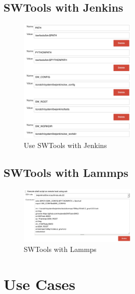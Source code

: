 \documentclass[10pt, conference, compsocconf]{IEEEtran}
\begin{document}
\subsection{SWTools with Jenkins}
\begin{figure}[H]
\centering
\includegraphics[width=0.5\textwidth]{swtools-Jenkins}
\caption{ Use SWTools with Jenkins }
\label{fig:swtools-jenkins}
\end{figure}

\subsection{SWTools with Lammps}
\begin{figure}[H]
\centering
\includegraphics[width=0.5\textwidth]{swtools-lammps}
\caption{ SWTools with Lammps }
\label{fig:swtools-lammps}
\end{figure}

\section{Use Cases}
\label{sec:results}
\end{document}
